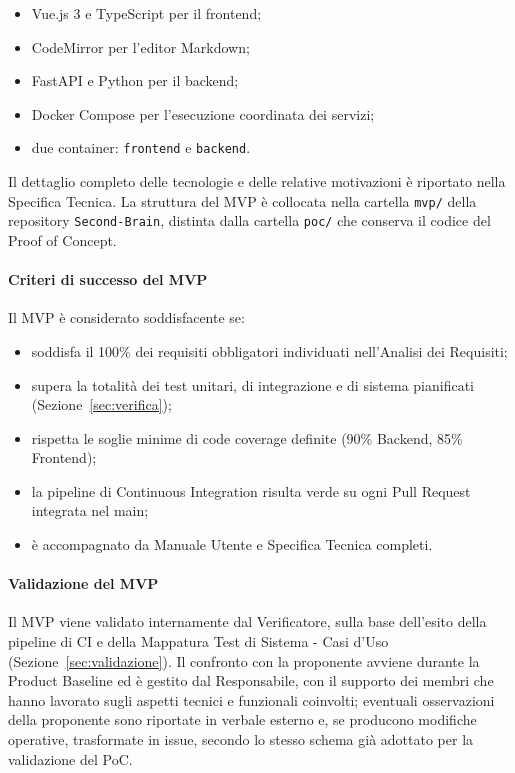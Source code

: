 \begin{itemize}
    \item Vue.js 3 e TypeScript per il frontend;
    \item CodeMirror per l'editor Markdown;
    \item FastAPI e Python per il backend;
    \item Docker Compose per l'esecuzione coordinata dei servizi;
    \item due container: \texttt{frontend} e \texttt{backend}.
\end{itemize}

Il dettaglio completo delle tecnologie e delle relative motivazioni è riportato
nella Specifica Tecnica. La struttura del MVP è collocata nella cartella
\texttt{mvp/} della repository \texttt{Second-Brain}, distinta dalla cartella
\texttt{poc/} che conserva il codice del Proof of Concept.

\paragraph{Criteri di successo del MVP}

Il MVP è considerato soddisfacente se:

\begin{itemize}
    \item soddisfa il 100\% dei requisiti obbligatori individuati nell'Analisi dei Requisiti;
    \item supera la totalità dei test unitari, di integrazione e di sistema pianificati (Sezione~\ref{sec:verifica});
    \item rispetta le soglie minime di code coverage definite (90\% Backend, 85\% Frontend);
    \item la pipeline di Continuous Integration risulta verde su ogni Pull Request integrata nel main;
    \item è accompagnato da Manuale Utente e Specifica Tecnica completi.
\end{itemize}

\paragraph{Validazione del MVP}

Il MVP viene validato internamente dal Verificatore, sulla base dell'esito della
pipeline di CI e della Mappatura Test di Sistema - Casi d'Uso (Sezione~\ref{sec:validazione}).
Il confronto con la proponente avviene durante la Product Baseline ed è gestito
dal Responsabile, con il supporto dei membri che hanno lavorato sugli aspetti
tecnici e funzionali coinvolti; eventuali osservazioni della proponente sono
riportate in verbale esterno e, se producono modifiche operative, trasformate
in issue, secondo lo stesso schema già adottato per la validazione del PoC.

